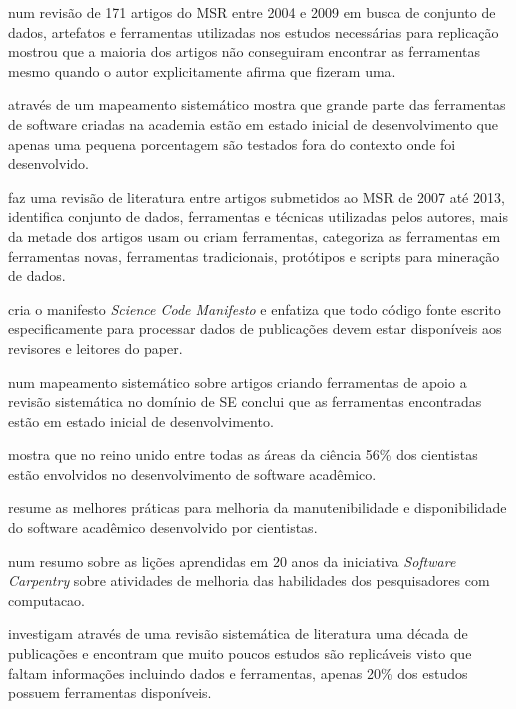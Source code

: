  num revisão de 171 artigos do MSR entre 2004 e 2009
em busca de conjunto de dados, artefatos e ferramentas utilizadas nos estudos
necessárias para replicação mostrou que a maioria dos artigos não conseguiram encontrar
as ferramentas mesmo quando o autor explicitamente afirma que fizeram uma.


através de um mapeamento sistemático mostra que grande parte das ferramentas de
software criadas na academia estão em estado inicial de desenvolvimento que
apenas uma pequena porcentagem são testados fora do contexto onde foi
desenvolvido. 

faz uma revisão de literatura entre artigos submetidos ao MSR de 2007 até 2013,
identifica conjunto de dados, ferramentas e técnicas utilizadas pelos autores,
mais da metade dos artigos usam ou criam ferramentas, categoriza as ferramentas
em ferramentas novas, ferramentas tradicionais, protótipos e scripts para
mineração de dados.

cria o manifesto {\it Science Code Manifesto} e enfatiza que todo código fonte
escrito especificamente para processar dados de publicações devem estar
disponíveis aos revisores e leitores do paper.

 num mapeamento sistemático sobre artigos criando
ferramentas de apoio a revisão sistemática no domínio de SE conclui que as
ferramentas encontradas estão em estado inicial de desenvolvimento.

 mostra que no reino unido entre todas as áreas da
ciência 56\% dos cientistas estão envolvidos no desenvolvimento de software
acadêmico.

 resume as melhores práticas para melhoria da
manutenibilidade e disponibilidade do software acadêmico desenvolvido por
cientistas.

 num resumo sobre as lições aprendidas em 20
anos da iniciativa {\it Software Carpentry} sobre atividades de melhoria das
habilidades dos pesquisadores com computacao.

investigam através de uma revisão sistemática de literatura uma década de
publicações e encontram que muito poucos estudos são replicáveis visto que
faltam informações incluindo dados e ferramentas, apenas 20\% dos estudos
possuem ferramentas disponíveis.

